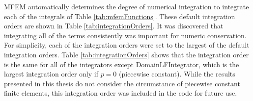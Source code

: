\documentclass{article}
\begin{document}
\begin{sidewaystable}[!h]
\caption{MFEM PDE function calls where the arguments have been dropped (see Equations \ref{eq:FEMDiscretized} and \ref{eq:FEMBoundaryCondition} for these details).}
\label{tab:mfemFunctions}
\end{sidewaystable}

MFEM automatically determines the degree of numerical integration to integrate each of the integrals of Table \ref{tab:mfemFunctions}. These default integration orders are shown in Table \ref{tab:integrationOrders}. It was discovered that integrating all of the terms consistently was important for numeric conservation. For simplicity, each of the integration orders were set to the largest of the default integration orders.
Table \ref{tab:integrationOrders} shows that the integration order is the same for all of the integrators except DomainLFIntegrator, which is the largest integration order only if $p = 0$ (piecewise constant). While the results presented in this thesis do not consider the circumstance of piecewise constant finite elements, this integration order was included in the code for future use.
\end{document}
